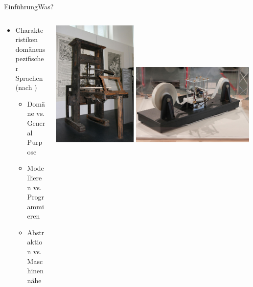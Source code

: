 \documentclass[t,aspectratio=169,divpsnames]{beamer}
\begin{document}
\begin{frame}{Einführung}{Was?}
	\begin{columns}
		\begin{column}{0.5\textwidth}
			\begin{itemize}
				\item Charakteristiken domänenspezifischer Sprachen (nach \cite[S. 30ff]{Voelter:13})
				\begin{itemize}
					\item<2-> Domäne vs. General Purpose
					\item<3-> Modellieren vs. Programmieren
					\item<4-> Abstraktion vs. Maschinennähe
				\end{itemize}
			\end{itemize}
		\end{column}
		\begin{column}{0.5\textwidth}
			\only<2>
			{
				\center
				\includegraphics[width=0.4\textwidth]{img/Druckpresse.jpg}
				\includegraphics[width=0.58\textwidth]{img/TuringMachine.jpg}
			}
		\end{column}
	\end{columns}
\end{frame}
\end{document}
